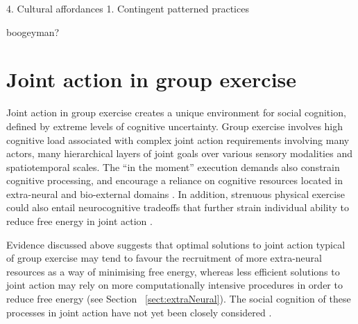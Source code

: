\begin{CJK}{UTF8}{gbsn}
4. Cultural affordances
    1. Contingent patterned practices

boogeyman?











































\section{Joint action in group exercise \label{sect:JAinGE}}

Joint action in group exercise creates a unique environment for social cognition, defined by extreme levels of cognitive uncertainty.  Group exercise involves high cognitive load associated with complex joint action requirements involving many actors, many hierarchical layers of joint goals over various sensory modalities and spatiotemporal scales. The ``in the moment'' execution demands also constrain cognitive processing, and encourage a reliance on cognitive resources located in extra-neural and bio-external domains \citep{Bourbousson2016}.  In addition, strenuous physical exercise could also entail neurocognitive tradeoffs that further strain individual ability to reduce free energy in joint action \citep{Dietrich2004b}.

Evidence discussed above suggests that optimal solutions to joint action typical of group exercise may tend to favour the recruitment of more extra-neural resources as a way of minimising free energy, whereas less efficient solutions to joint action may rely on more computationally intensive procedures in order to reduce free energy (see Section ~\ref{sect:extraNeural}).  The social cognition of these processes in joint action have not yet been closely considered \citep[but see ][]{Marsh2009,Lumsden2012}.





\end{CJK}
